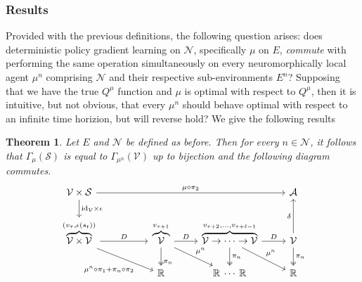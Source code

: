 \documentclass{article} %
\newtheorem{theorem}{Theorem}
\numberwithin{equation}{subsection}
\numberwithin{theorem}{subsection}
\def\reals{{\mathbb R}}
\def\scriptv{{\mathcal V}}
\def\scripta{{\mathcal A}}
\def\scriptn{{\mathcal N}}
\def\scripts{{\mathcal S}}
\begin{document}
\subsubsection{Results}
Provided with the previous definitions, the following question arises: does deterministic policy gradient learning on $\scriptn$, specifically $\mu$ on $E$, \emph{commute} with performing the same operation simultaneously on every neuromorphically local agent $\mu^n$ comprising $\scriptn$ and their respective sub-environments $E^n$? Supposing that we have the true $Q^\mu$ function and $\mu$ is optimal with respect to $Q^\mu$, then it is intuitive, but not obvious, that every $\mu^n$ should behave optimal with respect to an infinite time horizion, but will reverse hold? We give the following results
\begin{theorem}
	Let $E$ and $\scriptn$ be defined as before. Then for every $n \in \scriptn$, it follows that $\Gamma_\mu(\scripts)$ is equal to $\Gamma_{\mu^n}(\scriptv)$ up to bijection and the following diagram commutes.
\begin{equation}\label{eq:sub_env_com}
          \begin{tikzcd} %
			  \scriptv  \times \scripts \arrow{rrr}{\mu\circ\pi_2}
             \arrow{d}
               {\mathrm{id}_\scriptv\times\epsilon}  &[+25pt]    &     & \scripta    \\
  				\overbrace{\scriptv \times \scriptv}^{(v_{\tau},\epsilon(s_t))}
               				\arrow{r}{D}
			   	                        \arrow[pos = 0.7]{rd}[swap]{\mu^n\circ\pi_1 + \pi_n\circ\pi_2}
               				& \overbrace{\scriptv}^{v_{\tau+1}}
                                            \arrow{rd}
                                            {\mu^n}
                                            \arrow[two heads, pos=0.8]
                                              {d}
                                              {\pi_n}
                                              \arrow{r}
                                              {D}  & \overbrace{\scriptv\rightarrow\cdots\rightarrow\scriptv}^{v_{\tau+2},\dots,v_{\tau+{\ell-1}}}
                                              		 \arrow{r}{D}
                                              		 \arrow[two heads]{d}{\pi_n}
                                              		 \arrow{rd}{\mu^n}
                                              					& \scriptv
                                              					\arrow{u}{\delta}
                                              					\arrow[two heads]{d}{\pi_n} \\
  &\reals& \reals\:\cdots\:\reals & \reals
         \end{tikzcd} 
    \end{equation}
\end{theorem}
\end{document}
